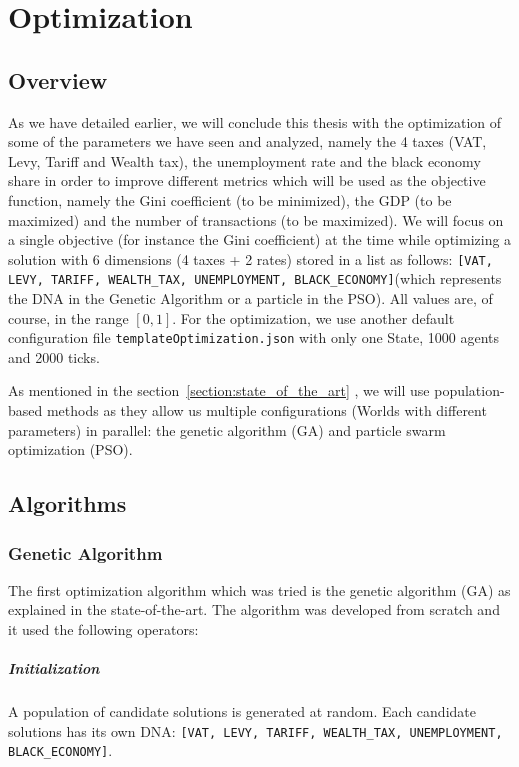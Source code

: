 \chapter{Optimization}

\section{Overview}
    As we have detailed earlier, we will conclude this thesis with the optimization of some of the parameters we have seen and analyzed, namely the 4 taxes (VAT, Levy, Tariff and Wealth tax), the unemployment rate and the black economy share in order to improve different metrics which will be used as the objective function, namely the Gini coefficient (to be minimized), the GDP (to be maximized) and the number of transactions (to be maximized). We will focus on a single objective (for instance the Gini coefficient) at the time while optimizing a solution with 6 dimensions (4 taxes + 2 rates) stored in a list as follows: \texttt{[VAT, LEVY, TARIFF, WEALTH\_TAX, UNEMPLOYMENT, BLACK\_ECONOMY]}(which represents the DNA in the Genetic Algorithm or a particle in the PSO). All values are, of course, in the range $[0, 1]$. For the optimization, we use another default configuration file \texttt{templateOptimization.json} with only one State, 1000 agents and 2000 ticks.
    
    As mentioned in the section~\ref{section:state_of_the_art} , we will use population-based methods as they allow us multiple configurations (Worlds with different parameters) in parallel: the genetic algorithm (GA) and particle swarm optimization (PSO).

\section{Algorithms}

    \subsection{Genetic Algorithm}

    The first optimization algorithm which was tried is the genetic algorithm (GA) as explained in the state-of-the-art. The algorithm was developed from scratch and it used the following operators:

        \paragraph{Initialization} A population of candidate solutions is generated at random. Each candidate solutions has its own DNA: \texttt{[VAT, LEVY, TARIFF, WEALTH\_TAX, UNEMPLOYMENT, BLACK\_ECONOMY]}.

